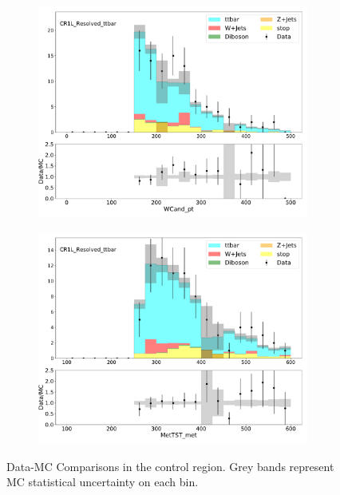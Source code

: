      \begin{figure}[htbp]
    \centering
     \begin{subfigure}{0.49\textwidth}
     \includegraphics[width = 0.98\textwidth]{Figures/4/datamc/CR1L_Resolved_ttbar/WCand_pt.pdf}
     \caption{\Wcandpt}
     \end{subfigure}
     \begin{subfigure}{0.49\textwidth}
     \includegraphics[width = 0.98\textwidth]{Figures/4/datamc/CR1L_Resolved_ttbar/MetTST_met.pdf}
     \caption{\met}
     \end{subfigure}

\caption{Data-MC Comparisons in the \resolved \ttbar control region. Grey bands represent MC statistical uncertainty on each bin.}
\label{fig:Data_MC_CRbV_resolved}
\end{figure}
\FloatBarrier
